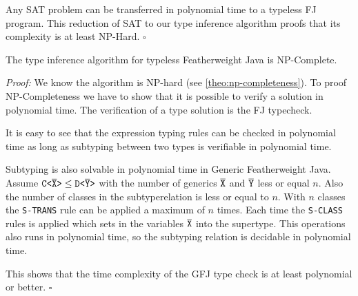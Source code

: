 Any SAT problem can be transferred in polynomial time to a typeless FJ program.
This reduction of SAT to our type inference algorithm proofs that its
complexity is at least NP-Hard.
\hfill $\square$

\begin{theorem}[NP-Completeness]
  \label{theo:np-completeness}
  The type inference algorithm for typeless Featherweight Java is NP-Complete.
\end{theorem}

\textit{Proof:} We know the algorithm is NP-hard (see \ref{theo:np-completeness}).
To proof NP-Completeness we have to show that it is possible to verify a solution in polynomial time.
The verification of a type solution is the FJ typecheck.

It is easy to see that the expression typing rules can be checked in polynomial time as long as subtyping between two types is verifiable in polynomial time.

Subtyping is also solvable in polynomial time in Generic Featherweight Java.
Assume $\mathtt{C \texttt{<} \overline{\tt X} \texttt{>} } \leq \mathtt{D \texttt{<} \overline{\tt Y} \texttt{>} }$ with the number of generics $\overline{\tt X}$ and $\overline{\tt Y}$ less or equal $n$.
Also the number of classes in the subtyperelation is less or equal to $n$.
With $n$ classes the \texttt{S-TRANS} rule can be applied a maximum of $n$ times.
Each time the \texttt{S-CLASS} rules is applied which sets in the variables $\overline{\tt X}$ into the supertype.
This operations also runs in polynomial time, so the subtyping relation is decidable in polynomial time.

This shows that the time complexity of the GFJ type check is at least
polynomial or better. 
\hfill $\square$


